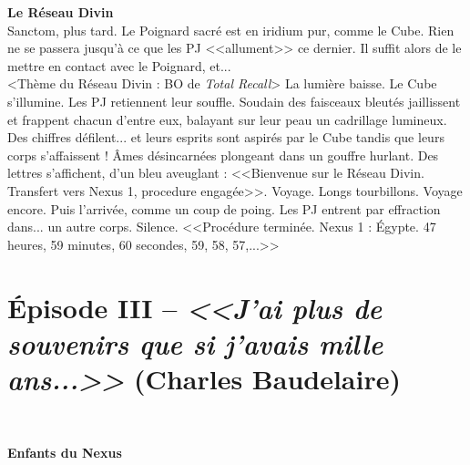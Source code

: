 \documentclass[11pt,twoside,a4paper]{book}
\begin{document}
\textbf{\large Le R{\'e}seau Divin}~\\

Sanctom, plus tard. Le Poignard sacr{\'e} est en iridium pur, comme le Cube. Rien ne se passera jusqu'{\`a} ce que les PJ <<allument>> ce dernier. Il suffit alors de le mettre en contact avec le Poignard, et...~\\

<Th{\`e}me du R{\'e}seau Divin : BO de \emph{Total Recall}> La lumi{\`e}re baisse. Le Cube s'illumine. Les PJ retiennent leur souffle. Soudain des faisceaux bleut{\'e}s jaillissent et frappent chacun d'entre eux, balayant sur leur peau un cadrillage lumineux. Des chiffres d{\'e}filent... et leurs esprits sont aspir{\'e}s par le Cube tandis que leurs corps s'affaissent ! {\^A}mes d{\'e}sincarn{\'e}es plongeant dans un gouffre hurlant. Des lettres s'affichent, d'un bleu aveuglant : <<Bienvenue sur le R{\'e}seau Divin. Transfert vers Nexus 1, procedure engag{\'e}e>>. Voyage. Longs tourbillons. Voyage encore. Puis l'arriv{\'e}e, comme un coup de poing. Les PJ entrent par effraction dans... un autre corps. Silence. <<Proc{\'e}dure termin{\'e}e. Nexus 1 : {\'E}gypte. 47 heures, 59 minutes, 60 secondes, 59, 58, 57,...>>~\\


\section*{{\'E}pisode III -- \emph{<<\textbf{J'ai plus de souvenirs que si j'avais mille ans...}>>} (Charles Baudelaire) }~\\


\textbf{\large Enfants du Nexus}~\\
\end{document}
